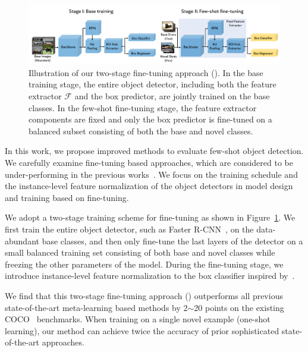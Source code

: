 \begin{figure}[ht]
    \centering
    \includegraphics[width=\linewidth]{figs/TFA_fig1.pdf}
    \vspace{-1cm}
    \caption{Illustration of our two-stage fine-tuning approach (\model). In the base training stage, the entire object detector, including both the feature extractor $\mathcal{F}$ and the box predictor, are jointly trained on the base classes. In the few-shot fine-tuning stage, the feature extractor components are fixed and only the box predictor is fine-tuned on a balanced subset consisting of both the base and novel classes.}
    \label{fig:tfa_arch}
\end{figure}

In this work, we propose improved methods to evaluate few-shot object detection. We carefully examine fine-tuning based approaches, which are 
considered to be under-performing in the previous works~\cite{kang2019few,yan2019meta,wang2019meta}.
We focus on the training schedule and the instance-level feature normalization of the object detectors in model design and training based on fine-tuning.

We adopt a two-stage training scheme for fine-tuning as shown in Figure~\ref{fig:tfa_arch}. We first train the entire object detector, such as Faster R-CNN~\cite{ren2015faster}, on the data-abundant base classes, and then only fine-tune the last layers of the detector
on a small balanced training set consisting of both base and novel classes while freezing the other parameters of the model. 
During the fine-tuning stage, we introduce instance-level feature normalization to the box classifier inspired by~\citet{gidaris2018dynamic,qi2018low,chen2019closer}. 


We find that this two-stage fine-tuning approach (\model) outperforms all previous
state-of-the-art meta-learning based methods by 2$\sim$20 points on the existing COCO~\cite{Lin2014MicrosoftCC} benchmarks. 
When training on a single novel example (one-shot learning), our method can achieve twice
the accuracy of prior sophisticated state-of-the-art approaches.



